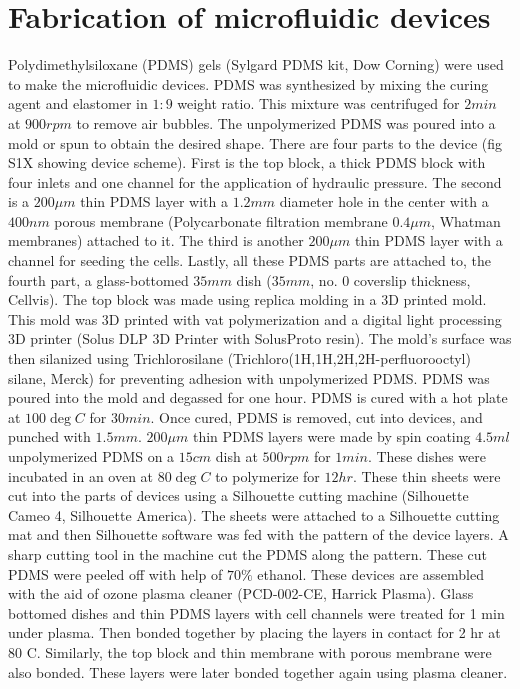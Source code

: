 \section{Fabrication of microfluidic devices}
 
Polydimethylsiloxane (PDMS) gels (Sylgard PDMS kit, Dow Corning) were used to make the microfluidic devices. PDMS was synthesized by mixing the curing agent and elastomer in $1:9$ weight ratio. This mixture was centrifuged for $2 min$ at $900 rpm$ to remove air bubbles. The unpolymerized PDMS was poured into a mold or spun to obtain the desired shape. 
There are four parts to the device (fig S1X showing device scheme). First is the top block, a thick PDMS block with four inlets and one channel for the application of hydraulic pressure. The second is a $200 \mu m$ thin PDMS layer with a $1.2 mm$ diameter hole in the center with a $400 nm$ porous membrane (Polycarbonate filtration membrane $0.4 \mu m$, Whatman membranes) attached to it. The third is another $200 \mu m$ thin PDMS layer with a channel for seeding the cells. Lastly, all these PDMS parts are attached to, the fourth part, a glass-bottomed $35 mm$ dish ($35 mm$, no. 0 coverslip thickness, Cellvis).
The top block was made using replica molding in a 3D printed mold. This mold was 3D printed with vat polymerization and a digital light processing 3D printer (Solus DLP 3D Printer with SolusProto resin). The mold’s surface was then silanized using Trichlorosilane (Trichloro(1H,1H,2H,2H-perfluorooctyl) silane, Merck) for preventing adhesion with unpolymerized PDMS. PDMS was poured into the mold and degassed for one hour. PDMS is cured with a hot plate at $100 \deg C$ for $30 min$. Once cured, PDMS is removed, cut into devices, and punched with $1.5 mm$.
$200 \mu m$ thin PDMS layers were made by spin coating $4.5 ml$ unpolymerized PDMS on a $15 cm$ dish at $500 rpm$ for $1 min$. These dishes were incubated in an oven at $80 \deg C$ to polymerize for $12 hr$. These thin sheets were cut into the parts of devices using a Silhouette cutting machine (Silhouette Cameo 4, Silhouette America). The sheets were attached to a Silhouette cutting mat and then Silhouette software was fed with the pattern of the device layers. A sharp cutting tool in the machine cut the PDMS along the pattern. These cut PDMS were peeled off with help of $70\%$ ethanol.
These devices are assembled with the aid of ozone plasma cleaner (PCD-002-CE, Harrick Plasma). Glass bottomed dishes and thin PDMS layers with cell channels were treated for 1 min under plasma. Then bonded together by placing the layers in contact for 2 hr at 80 C. Similarly, the top block and thin membrane with porous membrane were also bonded. These layers were later bonded together again using plasma cleaner.

